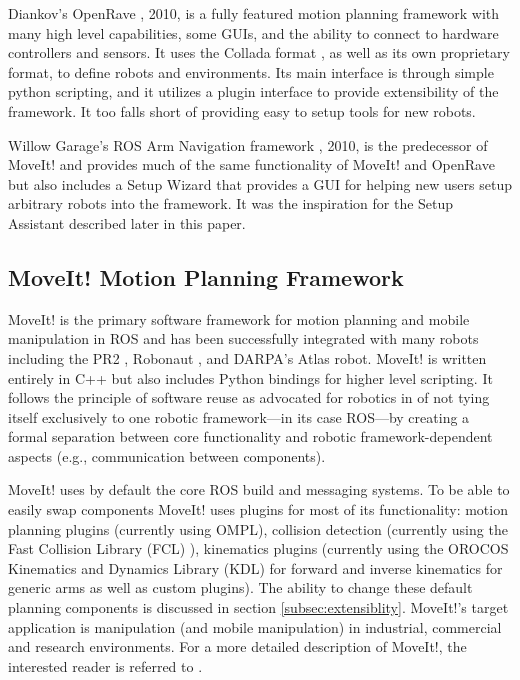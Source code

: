 \documentclass[10pt,journal,compsoc]{joser1}
\begin{document}
{Diankov's OpenRave \cite{diankov2008openrave}, 2010, is a fully featured motion
planning framework with many high level capabilities, some GUIs, and the ability
to connect to hardware controllers and sensors. It uses the Collada format
\cite{collada}, as well as its own proprietary format, to define robots and
environments. Its main interface is through simple python scripting, and it
utilizes a plugin interface to provide extensibility of the framework. It too
falls short of providing easy to setup tools for new robots. 

Willow Garage's ROS Arm Navigation framework \cite{chitta2012perception}, 2010,
is the predecessor of MoveIt! and provides much of the same functionality of
MoveIt! and OpenRave but also includes a Setup Wizard that provides a GUI for
helping new users setup arbitrary robots into the framework. It was the
inspiration for the Setup Assistant described later in this paper.
\subsection{MoveIt! Motion Planning Framework}
\label{sec::moveit}

MoveIt!\cite{moveit} is the primary software framework for motion planning and
mobile manipulation in ROS and has been successfully integrated with many robots
including the PR2 \cite{wyrobek2008towards}, Robonaut
\cite{ambrose2000robonaut}, and DARPA's Atlas robot. MoveIt! is written entirely
in C++ but also includes Python bindings for higher level scripting. It follows
the principle of software reuse as advocated for robotics in
\cite{makarenko2007benefits} of not tying itself exclusively to one robotic
framework---in its case ROS---by creating a formal separation between core
functionality and robotic framework-dependent aspects (e.g., communication
between components).

MoveIt! uses by default the core ROS build and messaging systems. To be able to easily swap
components MoveIt! uses plugins for most of its functionality: motion planning
plugins (currently using OMPL), collision detection (currently using the Fast
Collision Library (FCL) \cite{fcl}), kinematics plugins (currently using  the
OROCOS Kinematics and Dynamics Library (KDL) \cite{kdl} for forward and inverse
kinematics for generic arms as well as custom plugins). The ability to change
these default planning components is discussed in section
\ref{subsec:extensiblity}. MoveIt!'s target application is manipulation (and
mobile manipulation) in industrial, commercial and research environments. For a
more detailed description of MoveIt!, the interested reader is referred to
\cite{moveit}.


}
\end{document}
